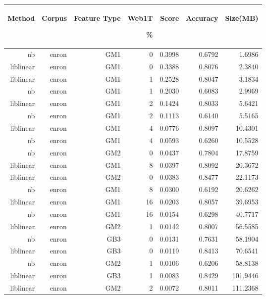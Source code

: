 \begin{table}[htbp!]
	\begin{center}
		\begin{tabular}{ | r | r | r | r | r | r | r | }
			\hline
			\begin{sideways}Method\end{sideways} & \begin{sideways}Corpus\end{sideways} & \begin{sideways}Feature Type\end{sideways} & \begin{sideways}Web1T\end{sideways} \% & \begin{sideways}Score\end{sideways} & \begin{sideways}Accuracy\end{sideways} & \begin{sideways}Size(MB)\end{sideways}\\ \hline 

		nb & enron & GM1 & 0 & 0.3998 & 0.6792 & 1.6986\\ \hline 
		liblinear & enron & GM1 & 0 & 0.3388 & 0.8076 & 2.3840\\ \hline 
		liblinear & enron & GM1 & 1 & 0.2528 & 0.8047 & 3.1834\\ \hline 
		nb & enron & GM1 & 1 & 0.2030 & 0.6083 & 2.9969\\ \hline 
		liblinear & enron & GM1 & 2 & 0.1424 & 0.8033 & 5.6421\\ \hline 
		nb & enron & GM1 & 2 & 0.1113 & 0.6140 & 5.5165\\ \hline 
		liblinear & enron & GM1 & 4 & 0.0776 & 0.8097 & 10.4301\\ \hline 
		nb & enron & GM1 & 4 & 0.0593 & 0.6260 & 10.5528\\ \hline 
		nb & enron & GM2 & 0 & 0.0437 & 0.7804 & 17.8759\\ \hline 
		liblinear & enron & GM1 & 8 & 0.0397 & 0.8092 & 20.3672\\ \hline 
		liblinear & enron & GM2 & 0 & 0.0383 & 0.8477 & 22.1173\\ \hline 
		nb & enron & GM1 & 8 & 0.0300 & 0.6192 & 20.6262\\ \hline 
		liblinear & enron & GM1 & 16 & 0.0203 & 0.8057 & 39.6953\\ \hline 
		nb & enron & GM1 & 16 & 0.0154 & 0.6298 & 40.7717\\ \hline 
		liblinear & enron & GM2 & 1 & 0.0142 & 0.8007 & 56.5585\\ \hline 
		nb & enron & GB3 & 0 & 0.0131 & 0.7631 & 58.1904\\ \hline 
		liblinear & enron & GB3 & 0 & 0.0119 & 0.8413 & 70.6541\\ \hline 
		nb & enron & GM2 & 1 & 0.0106 & 0.6206 & 58.8138\\ \hline 
		liblinear & enron & GB3 & 1 & 0.0083 & 0.8429 & 101.9446\\ \hline 
		liblinear & enron & GM2 & 2 & 0.0072 & 0.8011 & 111.2368\\ \hline 



\end{tabular}
\end{center}
\end{table}
